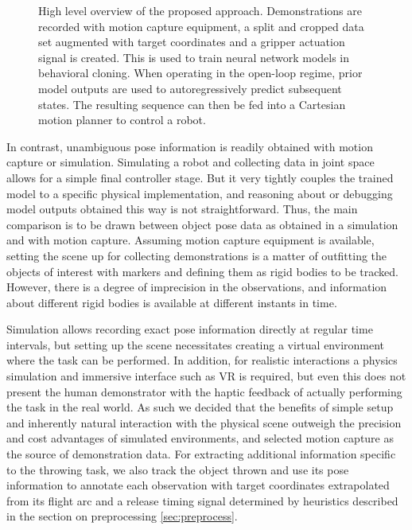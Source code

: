 \documentclass{article}
\begin{document}
\begin{figure}
	\centering
	\caption{High level overview of the proposed approach. Demonstrations are recorded with motion capture equipment, a split and cropped data set augmented with target coordinates and a gripper actuation signal is created. This is used to train neural network models in behavioral cloning. When operating in the open-loop regime, prior model outputs are used to autoregressively predict subsequent states. The resulting sequence can then be fed into a Cartesian motion planner to control a robot.}
	\label{fig:approach}
\end{figure}

In contrast, unambiguous pose information is readily obtained with motion capture or simulation. Simulating a robot and collecting data in joint space allows for a simple final controller stage. But it very tightly couples the trained model to a specific physical implementation, and reasoning about or debugging model outputs obtained this way is not straightforward. Thus, the main comparison is to be drawn between object pose data as obtained in a simulation and with motion capture. Assuming motion capture equipment is available, setting the scene up for collecting demonstrations is a matter of outfitting the objects of interest with markers and defining them as rigid bodies to be tracked. However, there is a degree of imprecision in the observations, and information about different rigid bodies is available at different instants in time. 

Simulation allows recording exact pose information directly at regular time intervals, but setting up the scene necessitates creating a virtual environment where the task can be performed. In addition, for realistic interactions a physics simulation and immersive interface such as VR is required, but even this does not present the human demonstrator with the haptic feedback of actually performing the task in the real world. As such we decided that the benefits of simple setup and inherently natural interaction with the physical scene outweigh the precision and cost advantages of simulated environments, and selected motion capture as the source of demonstration data. For extracting additional information specific to the throwing task, we also track the object thrown and use its pose information to annotate each observation with target coordinates extrapolated from its flight arc and a release timing signal determined by heuristics described in the section on preprocessing \ref{sec:preprocess}.
\end{document}
